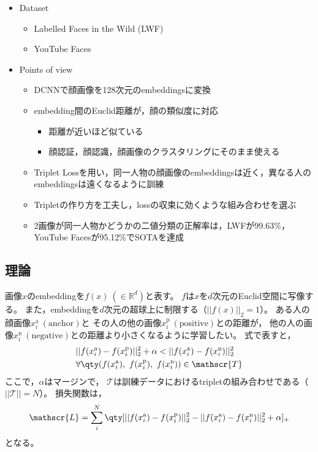 \documentclass[dvipdfmx, fleqn]{jsarticle}
\begin{document}
\begin{itemize}
    \item Dataset
    \begin{itemize}
        \item Labelled Faces in the Wild (LWF)
        \item YouTube Faces
    \end{itemize}
    \item Points of view
    \begin{itemize}
        \item DCNNで顔画像を128次元のembeddingsに変換
        \item embedding間のEuclid距離が，顔の類似度に対応
        \begin{itemize}
            \item 距離が近いほど似ている
            \item 顔認証，顔認識，顔画像のクラスタリングにそのまま使える
        \end{itemize}
        \item Triplet Lossを用い，同一人物の顔画像のembeddingsは近く，異なる人のembeddingsは遠くなるように訓練
        \item Tripletの作り方を工夫し，lossの収束に効くような組み合わせを選ぶ
        \item 2画像が同一人物かどうかの二値分類の正解率は，LWFが99.63{\%}，YouTube Facesが95.12{\%}でSOTAを達成
    \end{itemize}
\end{itemize}


\subsection{理論}

画像\(x\)のembeddingを\(f(x)\ (\in \mathbb{R}^{d})\)と表す。
\(f\)は\(x\)を\(d\)次元のEuclid空間に写像する。
また，embeddingを\(d\)次元の超球上に制限する（\(||f(x)||_2 = 1\)）。
ある人の顔画像\(x_i^\mathrm{a}\ (\text{anchor})\)と
その人の他の画像\(x_i^\mathrm{p}\ (\text{positive})\)との距離が，
他の人の画像\(x_i^\mathrm{n}\ (\text{negative})\)との距離より小さくなるように学習したい。
式で表すと，
\begin{align}
    & ||f(x_i^\mathrm{a}) - f(x_i^\mathrm{p})||_2^2 + \alpha < ||f(x_i^\mathrm{a}) - f(x_i^\mathrm{n})||_2^2
    \label{eq:wanted} \\
    & \forall \qty(f(x_i^\mathrm{a}),\ f(x_i^\mathrm{p}),\ f(x_i^\mathrm{n})) \in \mathscr{T}
    \label{eq:triplets}
\end{align}
ここで，\(\alpha\)はマージンで，
\(\mathscr{T}\)は訓練データにおけるtripletの組み合わせである（\(||\mathscr{T}|| = N\)）。
損失関数は，
\begin{equation}
    \mathscr{L} = \sum_{i}^{N} \qty[||f(x_i^\mathrm{a}) - f(x_i^\mathrm{p})||_2^2 - ||f(x_i^\mathrm{a}) - f(x_i^\mathrm{n})||_2^2 + \alpha]_{+}
    \label{eq:loss}
\end{equation}
となる。
\end{document}
